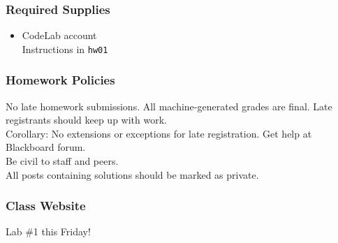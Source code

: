 \documentclass[11pt]{beamer}
\begin{document}
\begin{frame}
  \frametitle{Required Supplies}

  \begin{itemize}
    \item CodeLab account \\ \textcolor{\CSGradBot}{\footnotesize\hspace{1em} Instructions in \texttt{hw01}} %
  \end{itemize}
\end{frame}

\begin{frame}
  \frametitle{Homework Policies}
  \Enlarge

  \begin{itemize}
    \myitem No late homework submissions. \pause
    \myitem All machine-generated grades are final. \pause
    \myitem Late registrants should keep up with work. \\ \textcolor{\CSGradBot}{\footnotesize\hspace{1em} Corollary:  No extensions or exceptions for late registration.} \pause
    \myitem Get help at Blackboard forum. \\ \textcolor{\CSGradBot}{\footnotesize\hspace{1em} Be civil to staff and peers. \\ All posts containing solutions should be marked as private.}
  \end{itemize}
\end{frame}

\begin{frame}[plain,c]
  \frametitle{Class Website}
  \Enlarge

  \begin{center}
    \textcolor{\CSBase}{\Huge Lab \#1 this Friday!}
  \end{center}
\end{frame}
\end{document}
